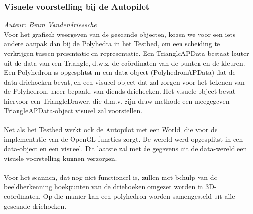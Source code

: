\subsubsection{Visuele voorstelling bij de Autopilot}
{\em Auteur: Bram Vandendriessche}\\

\noindent
Voor het grafisch weergeven van de gescande objecten, kozen we voor een iets andere aanpak dan bij de Polyhedra in het Testbed, om een scheiding te verkrijgen tussen presentatie en representatie. Een TriangleAPData bestaat louter uit de data van een Triangle, d.w.z. de co\"ordinaten van de punten en de kleuren. Een Polyhedron is opgesplitst in een data-object (PolyhedronAPData) dat de data-driehoeken bevat, en een visueel object dat zal zorgen voor het tekenen van de Polyhedron, meer bepaald van diends driehoeken. Het visuele object bevat hiervoor een TriangleDrawer, die d.m.v. zijn draw-methode een meegegeven TriangleAPData-object visueel zal voorstellen.\\
~\\
\noindent
Net als het Testbed werkt ook de Autopilot met een World, die voor de implementatie van de OpenGL-functies zorgt. De wereld werd opgesplitst in een data-object en een visueel. Dit laatste zal met de gegevens uit de data-wereld een visuele voorstelling kunnen verzorgen.\\
~\\
\noindent
Voor het scannen, dat nog niet functioneel is, zullen met behulp van de beeldherkenning %
hoekpunten van de driehoeken omgezet worden in 3D-coördinaten. Op die manier kan een polyhedron worden samengesteld uit alle gescande driehoeken.